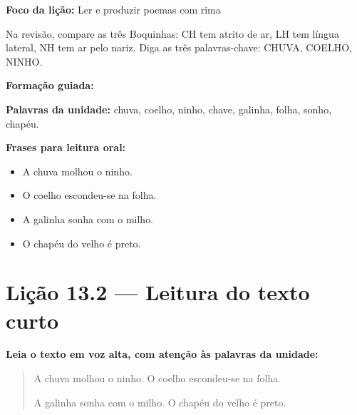 \textbf{Foco da lição:} Ler e produzir poemas com rima


\begin{boquinha}
Na revisão, compare as três Boquinhas: CH tem atrito de ar, LH tem língua lateral, NH tem ar pelo nariz. Diga as três palavras-chave: CHUVA, COELHO, NINHO.
\end{boquinha}

\noindent\textbf{Formação guiada:}

\begin{center}
\end{center}

\noindent\textbf{Palavras da unidade:} chuva, coelho, ninho, chave, galinha, folha, sonho, chapéu.

\noindent\textbf{Frases para leitura oral:}
\begin{itemize}[leftmargin=1.6em]
  \item A chuva molhou o ninho.
  \item O coelho escondeu-se na folha.
  \item A galinha sonha com o milho.
  \item O chapéu do velho é preto.
\end{itemize}

\section{Lição 13.2 --- Leitura do texto curto}

\noindent\textbf{Leia o texto em voz alta, com atenção às palavras da unidade:}


\begin{quote}
A chuva molhou o ninho. O coelho escondeu-se na folha.

A galinha sonha com o milho. O chapéu do velho é preto.
\end{quote}

